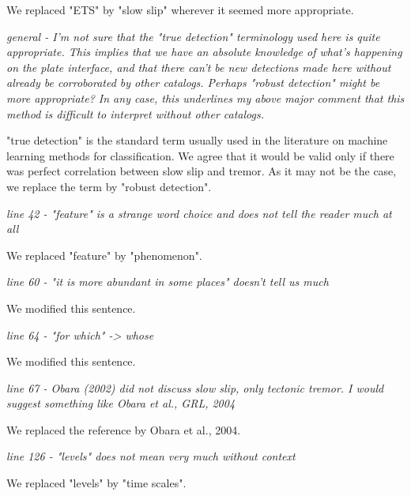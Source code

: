 \documentclass[letterpaper, 12pt]{article}
\begin{document}
\bigskip

We replaced "ETS" by "slow slip" wherever it seemed more appropriate.

\bigskip

\textit{general - I'm not sure that the "true detection" terminology used here is quite appropriate. This implies that we have an absolute knowledge of what's happening on the plate interface, and that there can't be new detections made here without already be corroborated by other catalogs. Perhaps "robust detection" might be more appropriate? In any case, this underlines my above major comment that this method is difficult to interpret without other catalogs.}

\bigskip

"true detection" is the standard term usually used in the literature on machine learning methods for classification. We agree that it would be valid only if there was perfect correlation between slow slip and tremor. As it may not be the case, we replace the term by "robust detection".

\bigskip

\textit{line 42 - "feature" is a strange word choice and does not tell the reader much at all}

\bigskip

We replaced "feature" by "phenomenon".

\bigskip

\textit{line 60 - "it is more abundant in some places" doesn't tell us much}

\bigskip

We modified this sentence.

\bigskip

\textit{line 64 - "for which" -> whose}

\bigskip

We modified this sentence.

\bigskip

\textit{line 67 - Obara (2002) did not discuss slow slip, only tectonic tremor. I would suggest something like Obara et al., GRL, 2004}

\bigskip

We replaced the reference by Obara et al., 2004.

\bigskip

\textit{line 126 - "levels" does not mean very much without context}

\bigskip

We replaced "levels" by "time scales".
\end{document}
